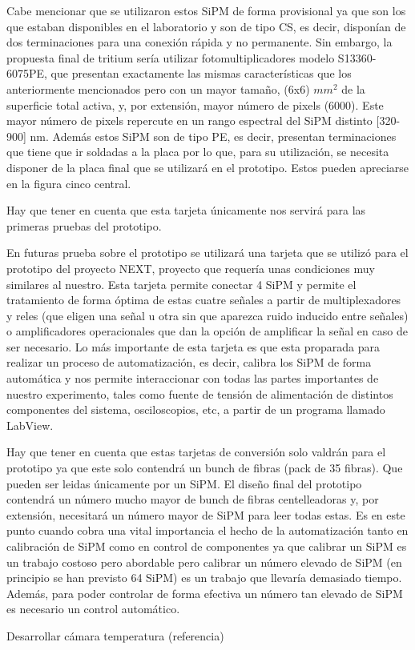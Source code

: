 Cabe mencionar que se utilizaron estos SiPM de forma provisional ya que son los que estaban disponibles en el laboratorio y son de tipo CS, es decir, disponían de dos terminaciones para una conexión rápida y no permanente. Sin embargo, la propuesta final de tritium sería utilizar fotomultiplicadores modelo S13360-6075PE,  que presentan exactamente las mismas características que los anteriormente mencionados pero con un mayor tamaño, (6x6) $mm^2$ de la superficie total activa, y, por extensión, mayor número de pixels (6000). Este mayor número de pixels repercute en un rango espectral del SiPM distinto [320-900] nm. Además estos SiPM son de tipo PE, es decir, presentan terminaciones que tiene que ir soldadas a la placa por lo que, para su utilización, se necesita disponer de la placa final que se utilizará en el prototipo. Estos pueden apreciarse en la figura cinco central.



Hay que tener en cuenta que esta tarjeta únicamente nos servirá para las primeras pruebas del prototipo. 

En futuras prueba sobre el prototipo se utilizará una tarjeta que se utilizó para el prototipo del proyecto NEXT, proyecto que requería unas condiciones muy similares al nuestro. Esta tarjeta permite conectar 4 SiPM y permite el tratamiento de forma óptima de estas cuatre señales a partir de multiplexadores y reles (que eligen una señal u otra sin que aparezca ruido inducido entre señales) o amplificadores operacionales que dan la opción de amplificar la señal en caso de ser necesario. Lo más importante de esta tarjeta es que esta proparada para realizar un proceso de automatización, es decir, calibra los SiPM de forma automática y nos permite interaccionar con todas las partes importantes de nuestro experimento, tales como fuente de tensión de alimentación de distintos componentes del sistema, osciloscopios, etc, a partir de un programa llamado LabView.

Hay que tener en cuenta que estas tarjetas de conversión solo valdrán para el prototipo ya que este solo contendrá un bunch de fibras (pack de 35 fibras). Que pueden ser leidas únicamente por un SiPM. El diseño final del prototipo contendrá un número mucho mayor de bunch de fibras centelleadoras y, por extensión, necesitará un número mayor de SiPM para leer todas estas. Es en este punto cuando cobra una vital importancia el hecho de la automatización tanto en calibración de SiPM como en control de componentes ya que calibrar un SiPM es un trabajo costoso pero abordable pero calibrar un número elevado de SiPM (en principio se han previsto 64 SiPM) es un trabajo que llevaría demasiado tiempo. Además, para poder controlar de forma efectiva un número tan elevado de SiPM es necesario un control automático. 


Desarrollar cámara temperatura (referencia)